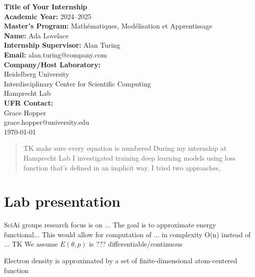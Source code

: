 \documentclass[a4paper,10pt]{report}
\author{Łukasz Adamowicz}
\begin{document}
\begin{titlepage}
    \begin{center}
        \textbf{\Large Title of Your Internship}\\[2cm]
        \textbf{Academic Year:} 2024--2025\\
        \textbf{Master's Program:} Mathématiques, Modélisation et Apprentissage\\
        \textbf{Name:} Ada Lovelace\\[1cm]
        \textbf{Internship Supervisor:} Alan Turing\\
        \textbf{Email:} alan.turing@company.com\\[1cm]
        \textbf{Company/Host Laboratory:}\\
        Heidelberg University\\
        Interdisciplinary Center for Scientific Computing\\
        Hamprecht Lab\\[1cm]
        \textbf{UFR Contact:}\\
        Grace Hopper\\
        grace.hopper@university.edu\\[2cm]

        \vfill
        \today
    \end{center}
\end{titlepage}


\begin{abstract}
TK make sure every equation is numbered
During my internship at Hamprecht Lab I investigated training deep learning models using loss function that's defined in an implicit way. I tried two approaches,
\end{abstract}


\tableofcontents

\section{Lab presentation}
SciAi groups research focus is on ...
The goal is to approximate energy functional...
This would allow for computation of ... in complexity O(n) instead of ...
TK
We assume $E(\theta, p)$ is ??? differentiable/continuous

Electron density is approximated by a set of finite-dimensional  atom-centered function
\end{document}
